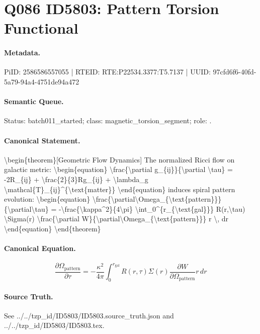 \section*{Q086 ID5803: Pattern Torsion Functional}
\paragraph{Metadata.}
PiID: 2586586557055 | RTEID: RTE:P22534.3377:T5.7137 | UUID: 97cfd6f6-40fd-5a79-94a4-4751de94a472

\paragraph{Semantic Queue.}
Status: batch011\_started; class: magnetic\_torsion\_segment; role: .

\paragraph{Canonical Statement.}
\textbackslash{}begin\{theorem\}[Geometric Flow Dynamics] The normalized Ricci flow on galactic metric: \textbackslash{}begin\{equation\} \textbackslash{}frac\{\textbackslash{}partial g\_\{ij\}\}\{\textbackslash{}partial \textbackslash{}tau\} = -2R\_\{ij\} + \textbackslash{}frac\{2\}\{3\}Rg\_\{ij\} + \textbackslash{}lambda\_g \textbackslash{}mathcal\{T\}\_\{ij\}\textasciicircum{}\{\textbackslash{}text\{matter\}\} \textbackslash{}end\{equation\} induces spiral pattern evolution: \textbackslash{}begin\{equation\} \textbackslash{}frac\{\textbackslash{}partial\textbackslash{}Omega\_\{\textbackslash{}text\{pattern\}\}\}\{\textbackslash{}partial\textbackslash{}tau\} = -\textbackslash{}frac\{\textbackslash{}kappa\textasciicircum{}2\}\{4\textbackslash{}pi\} \textbackslash{}int\_0\textasciicircum{}\{r\_\{\textbackslash{}text\{gal\}\}\} R(r,\textbackslash{}tau) \textbackslash{}Sigma(r) \textbackslash{}frac\{\textbackslash{}partial W\}\{\textbackslash{}partial\textbackslash{}Omega\_\{\textbackslash{}text\{pattern\}\}\} r \textbackslash{}, dr \textbackslash{}end\{equation\} \textbackslash{}end\{theorem\}

\paragraph{Canonical Equation.}
\[
\begin{equation} \frac{\partial\Omega_{\text{pattern}}}{\partial\tau} = -\frac{\kappa^2}{4\pi} \int_0^{r_{\text{gal}}} R(r,\tau) \Sigma(r) \frac{\partial W}{\partial\Omega_{\text{pattern}}} r \, dr \end{equation}
\]

\paragraph{Source Truth.}
See ../../tzp\_id/ID5803/ID5803.source\_truth.json and ../../tzp\_id/ID5803/ID5803.tex.
